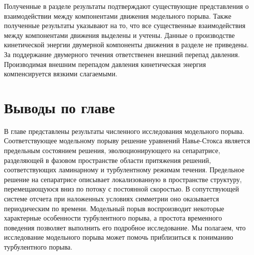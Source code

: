 Полученные в разделе результаты подтверждают существующие представления о взаимодействии между компонентами движения модельного порыва. Также полученные результаты указывают на то, что все существенные взаимодействия между компонентами движения выделены и учтены. Данные о производстве кинетической энергии двумерной компоненты движения в разделе не приведены. За поддержание двумерного течения ответственен внешний перепад давления. Производимая внешним перепадом давления кинетическая энергия компенсируется вязкими слагаемыми. 



\section{Выводы по главе}

В главе представлены результаты численного исследования модельного порыва. Соответствующее модельному порыву решение уравнений Навье-Стокса является предельным состоянием решения, эволюционирующего на сепаратрисе, разделяющей в фазовом пространстве области притяжения решений, соответствующих ламинарному и турбулентному режимам течения. Предельное решение на сепаратрисе описывает локализованную в пространстве структуру, перемещающуюся вниз по потоку с постоянной скоростью. В сопутствующей системе отсчета при наложенных условиях симметрии оно оказывается периодическим по времени. Модельный порыв воспроизводит некоторые характерные особенности турбулентного порыва, а простота временного поведения позволяет выполнить его подробное исследование. Мы полагаем, что исследование модельного порыва может помочь приблизиться к пониманию турбулентного порыва.

